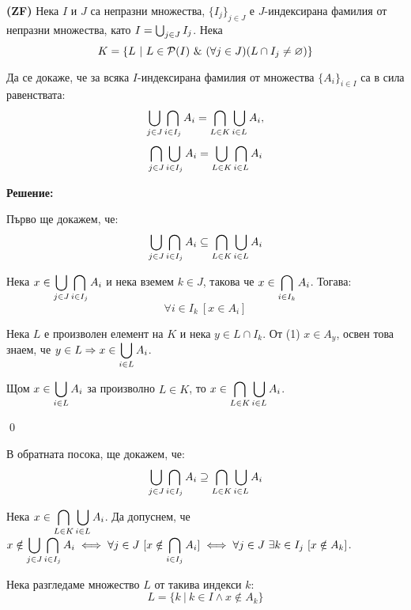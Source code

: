 \begin{problem}
\textbf{(ZF)}
Нека $I$ и $J$ са непразни множества, $\{I_j\}_{j \in J}$ е $J$-индексирана фамилия от непразни множества,
като $I = \bigcup_{j \in J} I_j$. Нека
\[
K = \{L\ |\ L \in \pow(I) \land (\forall j \in J) (L \cap I_j \neq \varnothing)\}
\]

Да се докаже, че за всяка $I$-индексирана фамилия от множества $\{A_i\}_{i \in I}$ са в сила равенствата:
\[
\bigcup_{j \in J} \bigcap_{i \in I_j} A_i = \bigcap_{L \in K} \bigcup_{i \in L} A_i,
\]
\[
\bigcap_{j \in J} \bigcup_{i \in I_j} A_i = \bigcup_{L \in K} \bigcap_{i \in L} A_i
\]

\textbf{Решение:}
\smallbreak

\quad
Първо ще докажем, че:
\[
\bigcup_{j \in J} \bigcap_{i \in I_j} A_i \subseteq \bigcap_{L \in K} \bigcup_{i \in L} A_i
\]

\begin{tcolorbox}[mybox={Доказателство:}]
\quad
Нека \(\displaystyle x \in \bigcup_{j \in J} \bigcap_{i \in I_j} A_i\) и нека
вземем $k \in J$, такова че $\displaystyle x \in \bigcap_{i \in I_k} A_i$. Тогава:
\begin{equation}
\forall i \in I_k\ [x \in A_i]
\end{equation}

\quad
Нека $L$ е произволен елемент на $K$ и нека $y \in L \cap I_k$.
От (1) $x \in A_y$, освен това знаем, че $\displaystyle y \in L \Rightarrow x \in \bigcup_{i \in L} A_i$.

\quad
Щом $\displaystyle x \in \bigcup_{i \in L} A_i$ за произволно $L \in K$,
то $\displaystyle x \in \bigcap_{L \in K} \bigcup_{i \in L} A_i$.

\qed
\end{tcolorbox}

\bigbreak
\quad
В обратната посока, ще докажем, че:
\[
\bigcup_{j \in J} \bigcap_{i \in I_j} A_i \supseteq \bigcap_{L \in K} \bigcup_{i \in L} A_i
\]
\begin{tcolorbox}[mybox={Доказателство:}]
\quad
Нека \(\displaystyle x \in \bigcap_{L \in K} \bigcup_{i \in L} A_i\).
Да допуснем, че
$\displaystyle x \notin \bigcup_{j \in J} \bigcap_{i \in I_j} A_i \iff
\forall j \in J\ [x \notin \bigcap_{i \in I_j} A_i] \iff
\forall j \in J\ \exists k \in I_j \ [x \notin A_k]$.

\quad
Нека разгледаме множество $L$ от такива индекси $k$:
\[
L = \{k \ |\ k \in I \land x \notin A_k\}
\]


\end{tcolorbox}
\end{problem}
